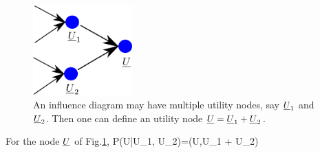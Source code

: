 \begin{figure}[h!]
\centering
\includegraphics[width=1.5in]
{inf-dia/util-merge.png}
\caption{An influence
diagram may have multiple
utility nodes, say ${\underline{U}}_1$ and
${\underline{U}}_2$. Then
one can define an
utility node ${\underline{U}}={\underline{U}}_1 + {\underline{U}}_2$. } 
\label{fig-util-merge}
\end{figure}

For the node ${\underline{U}}$ of 
Fig.\ref{fig-util-merge},
\beq\color{blue}
P(U|U_1, U_2)=\delta(U,U_1 + U_2)
\eeq